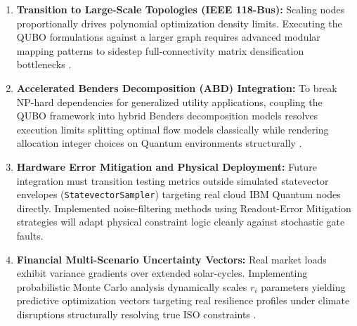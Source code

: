 \documentclass[a4paper,11pt,titlepage]{article}
\begin{document}
\begin{enumerate}
    \item \textbf{Transition to Large-Scale Topologies (IEEE 118-Bus):} Scaling nodes proportionally drives polynomial optimization density limits. Executing the QUBO formulations against a larger graph requires advanced modular mapping patterns to sidestep full-connectivity matrix densification bottlenecks \cite{pnnl2024emerging}.
    
    \item \textbf{Accelerated Benders Decomposition (ABD) Integration:} To break NP-hard dependencies for generalized utility applications, coupling the QUBO framework into hybrid Benders decomposition models resolves execution limits splitting optimal flow models classically while rendering allocation integer choices on Quantum environments structurally \cite{ellinas2024hybrid}.
    
    \item \textbf{Hardware Error Mitigation and Physical Deployment:} Future integration must transition testing metrics outside simulated statevector envelopes (\texttt{StatevectorSampler}) targeting real cloud IBM Quantum nodes directly. Implemented noise-filtering methods using Readout-Error Mitigation strategies will adapt physical constraint logic cleanly against stochastic gate faults.
    
    \item \textbf{Financial Multi-Scenario Uncertainty Vectors:} Real market loads exhibit variance gradients over extended solar-cycles. Implementing probabilistic Monte Carlo analysis dynamically scales $r_i$ parameters yielding predictive optimization vectors targeting real resilience profiles under climate disruptions structurally resolving true ISO constraints \cite{morstyn2024quantum}.
\end{enumerate}

\nocite{*}


\end{document}
